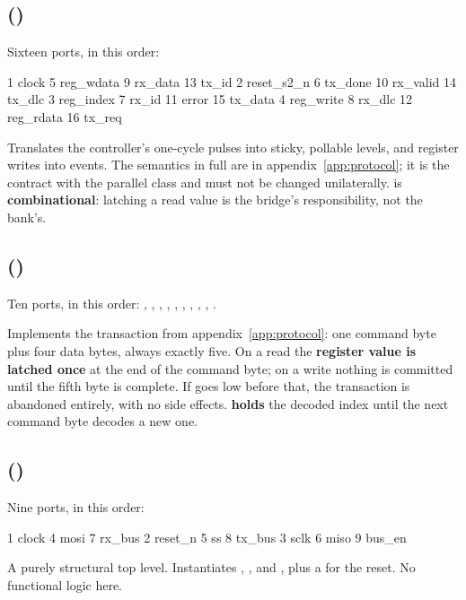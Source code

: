 \subsection*{ ()}
Sixteen ports, in this order:

\begin{textdrawing}
 1 clock        5 reg_wdata    9 rx_data     13 tx_id
 2 reset_s2_n   6 tx_done     10 rx_valid    14 tx_dlc
 3 reg_index    7 rx_id       11 error       15 tx_data
 4 reg_write    8 rx_dlc      12 reg_rdata   16 tx_req
\end{textdrawing}

Translates the controller's one-cycle pulses into sticky, pollable levels, and register writes into
events. The semantics in full are in appendix~\ref{app:protocol}; it is the contract with the parallel
class and must not be changed unilaterally.  is \textbf{combinational}: latching a
read value is the bridge's responsibility, not the bank's.

\subsection*{ ()}
Ten ports, in this order: , , , ,
, , , , ,
.

Implements the transaction from appendix~\ref{app:protocol}: one command byte plus four data bytes,
always exactly five. On a read the \textbf{register value is latched once} at the end of the command
byte; on a write nothing is committed until the fifth byte is complete. If  goes low
before that, the transaction is abandoned entirely, with no side effects. 
\textbf{holds} the decoded index until the next command byte decodes a new one.

\subsection*{ ()}
Nine ports, in this order:

\begin{textdrawing}
 1 clock      4 mosi     7 rx_bus
 2 reset_n    5 ss       8 tx_bus
 3 sclk       6 miso     9 bus_en
\end{textdrawing}

A purely structural top level. Instantiates , ,
 and , plus a  for the reset. No functional
logic here.

